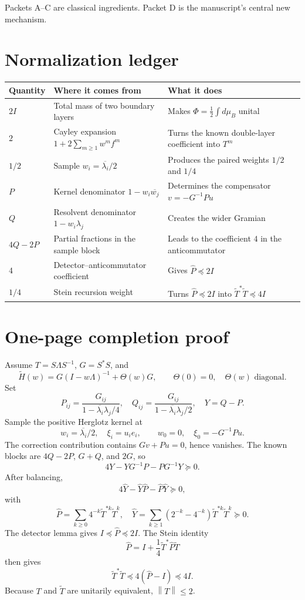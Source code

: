 \documentclass[11pt,oneside,openany]{book}
\theoremstyle{definition}
\theoremstyle{remark}
\newcommand{\norm}[1]{\left\lVert #1\right\rVert}
\begin{document}
Packets A--C are classical ingredients.  Packet D is the
manuscript's central new mechanism.

\section{Normalization ledger}

\begin{longtable}{@{}L{0.17\textwidth}L{0.30\textwidth}
                         L{0.42\textwidth}@{}}
\toprule
\textbf{Quantity}&\textbf{Where it comes from}&\textbf{What it does}\\
\midrule
\endhead
\(2I\)&Total mass of two boundary layers&
Makes \(\Phi=\frac12\int d\mu_B\) unital\\
\(2\)&Cayley expansion \(1+2\sum_{m\geq1}w^mf^m\)&
Turns the known double-layer coefficient into \(T^m\)\\
\(1/2\)&Sample \(w_i=\overline{\lambda_i}/2\)&
Produces the paired weights \(1/2\) and \(1/4\)\\
\(P\)&Kernel denominator \(1-w_i\overline{w_j}\)&
Determines the compensator \(v=-G^{-1}Pu\)\\
\(Q\)&Resolvent denominator \(1-w_i\lambda_j\)&
Creates the wider Gramian\\
\(4Q-2P\)&Partial fractions in the sample block&
Leads to the coefficient \(4\) in the anticommutator\\
\(4\)&Detector--anticommutator coefficient&
Gives \(\widehat P\preceq2I\)\\
\(1/4\)&Stein recursion weight&
Turns \(\widehat P\preceq2I\) into
\(\widetilde T^*\widetilde T\preceq4I\)\\
\bottomrule
\end{longtable}

\section{One-page completion proof}

Assume \(T=S\Lambda S^{-1}\), \(G=S^*S\), and
\[
  \widetilde H(w)
  =G(I-w\Lambda)^{-1}+\Theta(w)G,
  \qquad
  \Theta(0)=0,\quad\Theta(w)\text{ diagonal}.
\]
Set
\[
  P_{ij}=\frac{G_{ij}}{1-\overline{\lambda_i}\lambda_j/4},
  \quad
  Q_{ij}=\frac{G_{ij}}{1-\overline{\lambda_i}\lambda_j/2},
  \quad
  Y=Q-P.
\]
Sample the positive Herglotz kernel at
\[
  w_i=\overline{\lambda_i}/2,\quad
  \xi_i=u_ie_i,
  \qquad
  w_0=0,\quad
  \xi_0=-G^{-1}Pu.
\]
The correction contribution contains \(Gv+Pu=0\), hence vanishes.
The known blocks are \(4Q-2P\), \(G+Q\), and \(2G\), so
\[
  4Y-YG^{-1}P-PG^{-1}Y\succeq0.
\]
After balancing,
\[
  4\widehat Y-\widehat Y\widehat P
  -\widehat P\widehat Y\succeq0,
\]
with
\[
  \widehat P=\sum_{k\geq0}4^{-k}\widetilde T^{*k}\widetilde T^k,
  \quad
  \widehat Y=\sum_{k\geq1}(2^{-k}-4^{-k})
  \widetilde T^{*k}\widetilde T^k\succeq0.
\]
The detector lemma gives
\(
I\preceq\widehat P\preceq2I
\).
The Stein identity
\[
  \widehat P
  =I+\frac14\widetilde T^*\widehat P\widetilde T
\]
then gives
\[
  \widetilde T^*\widetilde T
  \preceq4(\widehat P-I)\preceq4I.
\]
Because \(T\) and \(\widetilde T\) are unitarily equivalent,
\(\norm{T}\leq2\).
\end{document}

